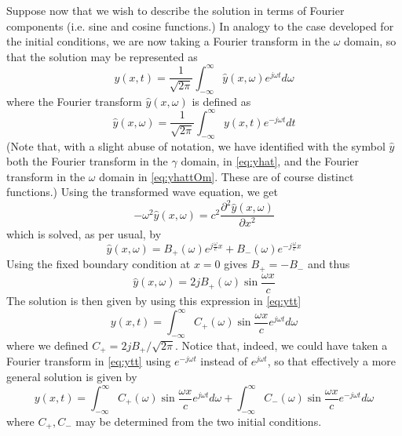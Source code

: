 \documentclass[11pt,twoside,a4paper,english]{book}
\begin{document}
Suppose now that we wish to describe the solution in terms of Fourier components (i.e. sine and cosine functions.) In analogy to the case developed for the initial conditions, we are now taking a Fourier transform in the $\omega$ domain, so that the solution may be represented as
\begin{equation}\label{eq:ytt}
y(x,t) = \frac{1}{\sqrt{2\pi}} \int_{-\infty}^{\infty} \hat y(x,\omega) e^{j\omega t} d\omega
\end{equation}
where the Fourier transform $\hat y(x,\omega)$ is defined as
\begin{equation}\label{eq:yhattOm}
\hat y(x,\omega) = \frac{1}{\sqrt{2\pi}} \int_{-\infty}^{\infty}  y(x,t) e^{-j\omega t} d t
\end{equation}
(Note that, with a slight abuse of notation, we have identified with the symbol $\hat y$ both the Fourier transform in the $\gamma$ domain, in \eqref{eq:yhat}, and the Fourier transform in the $\omega$ domain in \eqref{eq:yhattOm}. These are of course distinct functions.) Using the transformed wave equation, we get
\begin{equation}
-\omega^2 \hat y(x,\omega) = c^2 \frac{\partial^2 \hat y(x,\omega)}{\partial x^2}
\end{equation}
which is solved, as per usual, by
\begin{equation}\label{eq:bcss}
\hat y(x,\omega) = B_+(\omega) e^{j\frac{\omega}{c}x} + B_-(\omega) e^{-j\frac{\omega}{c}x}
\end{equation}
Using the fixed boundary condition at $x=0$ gives $B_+ = -B_-$ and thus
\begin{equation}\label{eq:FixedFou1}
\hat y(x,\omega) = 2jB_+(\omega) \sin \frac{\omega x}{c} 
\end{equation}
The solution is then given by using this expression in \eqref{eq:ytt}
\begin{equation}
y(x,t)=\int_{-\infty}^{\infty} C_+(\omega) \sin\frac{\omega x}{c} e^{j\omega t} d\omega
\end{equation}
where we defined $C_+ = 2 j B_+/\sqrt{2\pi}$. Notice that, indeed, we could have taken a Fourier transform in \eqref{eq:ytt} using $e^{-j \omega t}$ instead of $e^{j \omega t}$, so that effectively a more general solution is given by
\begin{equation}\label{eq:FixedFou}
y(x,t)=\int_{-\infty}^{\infty} C_+(\omega) \sin\frac{\omega x}{c} e^{j\omega t} d\omega +  \int_{-\infty}^{\infty} C_-(\omega) \sin\frac{\omega x}{c} e^{-j\omega t} d\omega
\end{equation}
where $C_+,C_-$ may be determined from the two initial conditions. 
\end{document}

